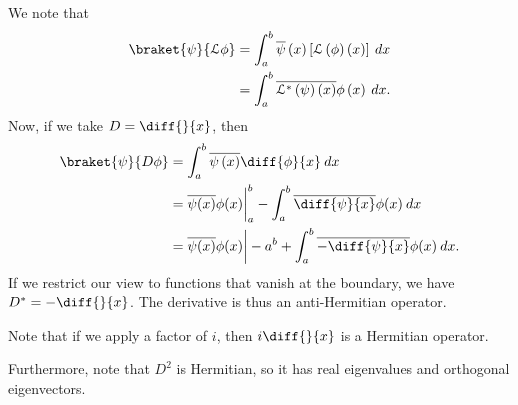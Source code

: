 \documentclass[10pt]{mypackage}
\begin{document}
  We note that
  \begin{align*}
    \braket{\psi}{\mathcal{L}\phi} &= \int_{a}^{b} \overline{\psi}\left( x \right) \left[ \mathcal{L}\left( \phi \right)\left( x \right) \right]\:dx\\
                                   &= \int_{a}^{b} \overline{\mathcal{L}^{\ast}\left( \psi \right)\left( x \right)}\phi\left( x \right)\:dx.
  \end{align*}
  Now, if we take $D = \diff{}{x}$, then
  \begin{align*}
    \braket{\psi}{D\phi} &= \int_{a}^{b} \overline{\psi\left( x \right)} \diff{\phi}{x}\:dx\\
                         &= \overline{\psi(x)}\phi(x)\biggr\vert_{a}^{b} - \int_{a}^{b} \overline{ \diff{\psi}{x} }\phi(x)\:dx\\
                         &= \overline{\psi(x)}\phi(x)\biggr\vert-{a}^{b} + \int_{a}^{b} \overline{-\diff{\psi}{x}} \phi(x)\:dx.
  \end{align*}
  If we restrict our view to functions that vanish at the boundary, we have $D^{\ast} = -\diff{}{x}$. The derivative is thus an anti-Hermitian operator.\newline

  Note that if we apply a factor of $i$, then $i\diff{}{x}$ is a Hermitian operator.\newline

  Furthermore, note that $D^2$ is Hermitian, so it has real eigenvalues and orthogonal eigenvectors.
\end{document}
